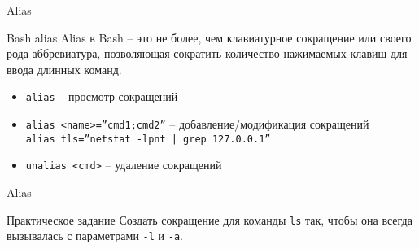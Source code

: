 \begin{frame}{Alias}
  \begin{block}{Bash alias}
    Alias в Bash -- это не более, чем клавиатурное сокращение или своего рода аббревиатура, 
    позволяющая сократить количество нажимаемых клавиш для ввода длинных команд.

    \begin{itemize}
        \item {\tt alias} -- просмотр сокращений
	\item {\tt alias <name>=''cmd1;cmd2''} -- добавление/модификация сокращений \\
	      {\tt alias tls=''netstat -lpnt | grep 127.0.0.1''}
        \item {\tt unalias <cmd>} -- удаление сокращений
    \end{itemize}
  \end{block}
\end{frame}
\begin{frame}{Alias}
  \begin{block}{Практическое задание}
  Создать сокращение для команды {\tt ls} так, чтобы она всегда вызывалась с параметрами {\tt -l} и {\tt -a}.
  \end{block}

\end{frame}
